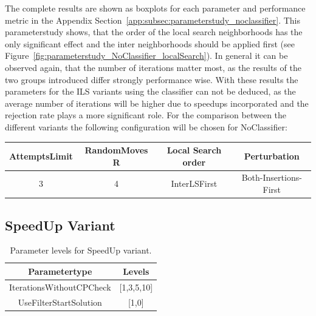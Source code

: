 \begin{figure}[ht]
\begin{minipage}[t]{0.49\textwidth}
        \label{fig:heatmap_parameter_study}
    \end{minipage}
\end{figure}

The complete results are shown as boxplots for each parameter and performance metric in the Appendix Section~\ref{app:subsec:parameterstudy_noclassifier}.
This parameterstudy shows, that the order of the local search neighborhoods has the only significant effect and the inter neighborhoods
should be applied first (see Figure~\ref{fig:parameterstudy_NoClassifier_localSearch}). In general it can be observed again, that
the number of iterations matter most, as the results of the two groups introduced differ strongly performance wise. With these results
the parameters for the \gls{ILS} variants using the classifier can not be deduced, as the average number of iterations will be higher due to
speedups incorporated and the rejection rate plays a more significant role. For the comparison between the different variants the following
configuration will be chosen for NoClassifier:

\begin{table}[ht]
    \centering
    \begin{tabular}{@{}cccc@{}}
        \toprule
        AttemptsLimit & RandomMoves        R & Local Search order & Perturbation          \\
        \midrule
        3             & 4                    & InterLSFirst       & Both-Insertions-First \\
        \bottomrule
    \end{tabular}
\end{table}

\subsection{SpeedUp Variant}
\label{subsec_parameterStuy_speedup}

\begin{table}[ht]
    \centering
    \begin{tabular}{c c }
        \toprule
        Parametertype            & Levels     \\
        \midrule
        IterationsWithoutCPCheck & [1,3,5,10] \\
        UseFilterStartSolution   & [1,0]      \\
        \bottomrule
    \end{tabular}
    \caption{Parameter levels for SpeedUp variant.}
    \label{tab:parameters_speedup}
\end{table}

